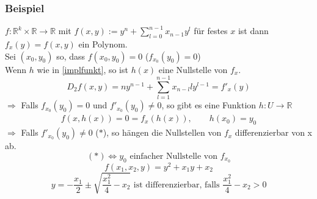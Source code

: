 \subsubsection{Beispiel} %
\label{ssub:beispiel}
$f: \mathbb{R}^k \times \mathbb{R} \to \mathbb{R}$ mit $f(x,y):= y^n + \sum_{l=0}^{n-1}x_{n-1}y^l$ für festes $x$ ist dann $f_x(y)=f(x,y)$ ein Polynom. \\
Sei $(x_0,y_0)$ so, dass $f(x_0,y_0)=0$ ($f_{x_0}(y_0)=0$) \\
Wenn $h$ wie in \ref{implfunkt}, so ist $h(x)$ eine Nullstelle von $f_x$.
\[
	D_2f(x,y)=ny^{n-1}+ \sum_{l=1}^{n-1}x_{n-l}ly^{l-1}=f'_x(y)
\]
$\Rightarrow$ Falls $f_{x_0}(y_0)=0$ und $f'_{x_0}(y_0) \neq 0$, so gibt es eine Funktion $h:U \to \mathbb{R}$
\begin{align*}
	f(x,h(x))=0 = f_x(h(x)), \qquad h(x_0)=y_0
\end{align*}
$\Rightarrow$ Falls $f'_{x_0}(y_0)\neq 0$ ($*$), so hängen die Nullstellen von $f_x$ differenzierbar von x ab. \\
\[
	(*) \Leftrightarrow y_0 \text{ einfacher Nullstelle von }f_{x_0}
\]
 \[
	f(x_1,x_2,y)=y^2 + x_1y + x_2
\]
\[
	y = - \frac{x_1}{2} \pm \sqrt{\frac{x_1^2}{4}-x_2} \text{ ist differenzierbar, falls } \frac{x_1^2}{4}-x_2 > 0
\]
\hphantom{p}
\hphantom{p}

